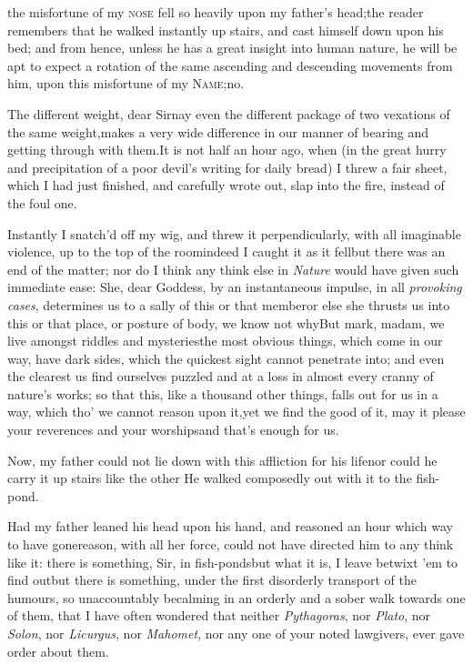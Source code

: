 \documentclass{article}
\begin{document}
 the misfortune of my\break
\textsc{nose} fell so heavily upon my\break
father’s head;\tsk the reader remembers that he walked
instantly up stairs, and cast himself down upon his bed; and
from hence, unless he has a great insight into human nature,
he will be apt to expect a rotation of the same ascending
and descending movements from him, upon this misfortune of
my \textsc{Name};\tsh\break no.

The different weight, dear Sir\tsh nay even the
different package of two vexations of the same
weight,\tsh makes a very wide difference in our manner of
bearing and getting through with them.\tsk It is not half
an hour ago, when (in the great hurry and precipitation of a poor
devil’s writing for daily bread) I threw a fair sheet, which
I had just finished, and carefully wrote out, slap into the fire,
instead of the foul one.

Instantly I snatch’d off my wig, and threw it
perpendicularly, with all imaginable violence, up to the top of the
room\break\tsk indeed I caught it as it fell\tsk but there was
an end of the matter; nor do I think any think else in
\textit{Nature} would have given such immediate ease: She, dear
Goddess, by an instantaneous impulse, in all \textit{provoking
cases}, determines us to a sally of this or that member\tsk or
else she thrusts us into this or that place, or posture of body, we
know not why\tsk But mark, madam, we live amongst riddles
and mysteries\tsk the most obvious things, which come in
our way, have dark sides, which the quickest sight cannot penetrate
into; and even the clearest 
us find ourselves puzzled and at a loss in almost every cranny of
nature’s works; so that this, like a thousand other things,
falls out for us in a way, which tho’ we cannot reason upon
it,\tsk yet we find the good of it, may it please your reverences
and your worships\tsh and that’s enough for us.

Now, my father could not lie down with this affliction for his
life\tsk nor could he carry it up stairs like the other\tsk
He walked composedly out with it to the fish-pond.

Had my father leaned his head upon his hand, and reasoned an
hour which way to have gone\tsk reason, with all her
force, could not have directed him to any think like it: there is
something, Sir, in fish-ponds\tsk but what it is, I leave\break
{} betwixt ’em to find
out\tsk but there is something, under the first disorderly\break
transport of the humours, so unaccountably becalming in an orderly
and a sober walk towards one of them, that I have often wondered
that neither \textit{Pythagoras}, nor \textit{Plato}, nor \textit{Solon},
nor \textit{Licurgus}, nor \textit{Mahomet}, nor any one of your noted
lawgivers, ever gave order about them.
\end{document}

